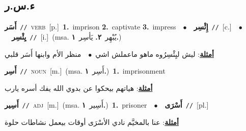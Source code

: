 \documentclass[10pt,a4paper,twoside]{article} %
\begin{document}
\begin{multicols}{2}
\vspace{-3mm}
\subsection*{\color{blue}\foreignlanguage{arabic}{ء.س.ر}\color{blue}{}} 

{\setlength\topsep{0pt}\textbf{\foreignlanguage{arabic}{أَسَر}}\ {\color{gray}\texttt{//}\color{black}}\ \textsc{verb}\ [p.]\ \textbf{1.}~imprison  \textbf{2.}~captivate  \textbf{3.}~impress\ \ $\bullet$\ \ \setlength\topsep{0pt}\textbf{\foreignlanguage{arabic}{إِئْسِر}}\ {\color{gray}\texttt{//}\color{black}}\ [c.]\ \ $\bullet$\ \ \setlength\topsep{0pt}\textbf{\foreignlanguage{arabic}{يِئْسِر}}\ {\color{gray}\texttt{//}\color{black}}\ [i.]\ \color{gray}(msa. \foreignlanguage{arabic}{يُبْهِر}~\foreignlanguage{arabic}{\textbf{٢.}}  \foreignlanguage{arabic}{يَأسِر}~\foreignlanguage{arabic}{\textbf{١.}})\color{black}\  \begin{flushright}\color{gray}\foreignlanguage{arabic}{\textbf{\underline{\foreignlanguage{arabic}{أمثلة}}}: ليش ليِئْسِرُوه ماهو ماعملش اشي\ $\bullet$\ \  منظر الأم وابنها أَسَر قلبي}\end{flushright}\color{black}} \vspace{2mm}

{\setlength\topsep{0pt}\textbf{\foreignlanguage{arabic}{أَسِر}}\ {\color{gray}\texttt{//}\color{black}}\ \textsc{noun}\ [m.]\ \color{gray}(msa. \foreignlanguage{arabic}{أَسِر}~\foreignlanguage{arabic}{\textbf{١.}})\color{black}\ \textbf{1.}~imprisonment\  \begin{flushright}\color{gray}\foreignlanguage{arabic}{\textbf{\underline{\foreignlanguage{arabic}{أمثلة}}}: هياتهم بيحكوا عن بدوي الله يفك أسره يارب}\end{flushright}\color{black}} \vspace{2mm}

{\setlength\topsep{0pt}\textbf{\foreignlanguage{arabic}{أَسِير}}\ {\color{gray}\texttt{//}\color{black}}\ \textsc{adj}\ [m.]\ \color{gray}(msa. \foreignlanguage{arabic}{أَسِير}~\foreignlanguage{arabic}{\textbf{١.}})\color{black}\ \textbf{1.}~prisoner\ \ $\bullet$\ \ \setlength\topsep{0pt}\textbf{\foreignlanguage{arabic}{أَسْرَى}}\ {\color{gray}\texttt{//}\color{black}}\ [pl.]\  \begin{flushright}\color{gray}\foreignlanguage{arabic}{\textbf{\underline{\foreignlanguage{arabic}{أمثلة}}}: عنا بالمخيَّم نادي الأسْرَى أوقات بيعمل نشاطات حلوة}\end{flushright}\color{black}} \vspace{2mm}


\end{multicols}
\end{document}
